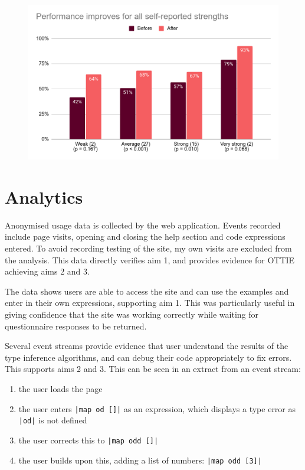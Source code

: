 \documentclass[a4paper,fleqn,oneside,12pt]{report}
\begin{document}
{\centering \begin{figure}[h!]
  \centering
  \includegraphics[width=0.85\linewidth]{images/image27.png}
  \label{figure:evaluation_testperformanceselfreported}
\end{figure} \par}

\section{Analytics}\label{id:h.67g05flyfv0z}

Anonymised usage data is collected by the web application. Events recorded include page visits, opening and closing the help section and code expressions entered. To avoid recording testing of the site, my own visits are excluded from the analysis. This data directly verifies aim 1, and provides evidence for OTTIE achieving aims 2 and 3.

The data shows users are able to access the site and can use the examples and enter in their own expressions, supporting aim 1. This was particularly useful in giving confidence that the site was working correctly while waiting for questionnaire responses to be returned.

Several event streams provide evidence that user understand the results of the type inference algorithms, and can debug their code appropriately to fix errors. This supports aims 2 and 3. This can be seen in an extract from an event stream:
\begin{enumerate}
  \item the user loads the page
  \item the user enters \texttt{|map od []|} as an expression, which displays a type error as \texttt{|od|} is not defined
  \item the user corrects this to \texttt{|map odd []|}
  \item the user builds upon this, adding a list of numbers: \texttt{|map odd [3]|}
\end{enumerate}
\end{document}
